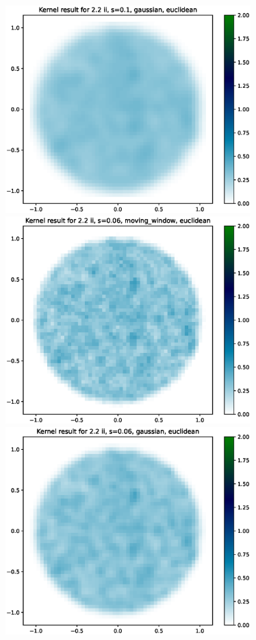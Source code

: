 \documentclass{article}
\begin{document}
\includegraphics[height=8cm]{comparisons//Kernel_result_2-2ii_s_0-1_gaussian_euclidean.eps} \vspace*{-3em}  \\
\hspace*{-1.5cm}\includegraphics[height=8cm]{comparisons//Kernel_result_2-2ii_s_0-06_moving_window_euclidean.eps} \hspace*{-1.5cm}
\includegraphics[height=8cm]{comparisons//Kernel_result_2-2ii_s_0-06_gaussian_euclidean.eps}  \\
\end{document}
